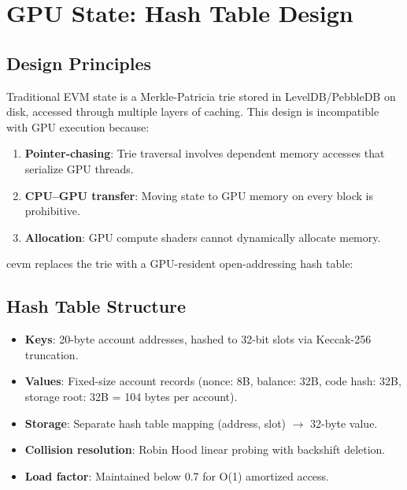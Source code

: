 \section{GPU State: Hash Table Design}

\label{sec:state}

\subsection{Design Principles}

Traditional EVM state is a Merkle-Patricia trie stored in LevelDB/PebbleDB on disk,
accessed through multiple layers of caching. This design is incompatible with GPU
execution because:

\begin{enumerate}
\item \textbf{Pointer-chasing}: Trie traversal involves dependent memory accesses that
      serialize GPU threads.
\item \textbf{CPU--GPU transfer}: Moving state to GPU memory on every block is prohibitive.
\item \textbf{Allocation}: GPU compute shaders cannot dynamically allocate memory.
\end{enumerate}

cevm replaces the trie with a GPU-resident open-addressing hash table:

\subsection{Hash Table Structure}

\begin{itemize}
\item \textbf{Keys}: 20-byte account addresses, hashed to 32-bit slots via Keccak-256
      truncation.
\item \textbf{Values}: Fixed-size account records (nonce: 8B, balance: 32B, code hash: 32B,
      storage root: 32B = 104 bytes per account).
\item \textbf{Storage}: Separate hash table mapping (address, slot) $\to$ 32-byte value.
\item \textbf{Collision resolution}: Robin Hood linear probing with backshift deletion.
\item \textbf{Load factor}: Maintained below 0.7 for O(1) amortized access.
\end{itemize}

